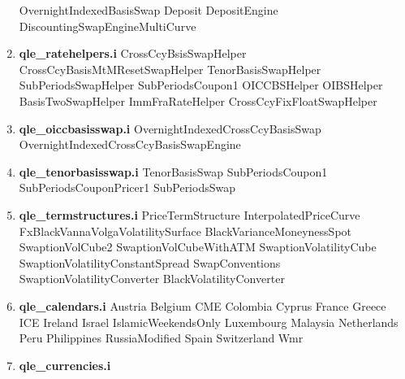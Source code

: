 \documentclass[10pt]{article}
\begin{document}
\begin{multicols}{2}
\begin{enumerate}
                \subitem OvernightIndexedBasisSwap
                \subitem Deposit
                \subitem DepositEngine
                \subitem DiscountingSwapEngineMultiCurve
        \item \textbf{qle\_ratehelpers.i}
                \subitem CrossCcyBsisSwapHelper
                \subitem CrossCcyBasisMtMResetSwapHelper
                \subitem TenorBasisSwapHelper
                \subitem SubPeriodsSwapHelper
                \subitem SubPeriodsCoupon1
                \subitem OICCBSHelper
                \subitem OIBSHelper
                \subitem BasisTwoSwapHelper
                \subitem ImmFraRateHelper
                \subitem CrossCcyFixFloatSwapHelper
        \item \textbf{qle\_oiccbasisswap.i}
                \subitem OvernightIndexedCrossCcyBasisSwap
                \subitem OvernightIndexedCrossCcyBasisSwapEngine
        \item \textbf{qle\_tenorbasisswap.i}
                \subitem TenorBasisSwap
                \subitem SubPeriodsCoupon1
                \subitem SubPeriodsCouponPricer1
                \subitem SubPeriodsSwap
        \item \textbf{qle\_termstructures.i}
                \subitem PriceTermStructure
                \subitem InterpolatedPriceCurve
                \subitem FxBlackVannaVolgaVolatilitySurface
                \subitem BlackVarianceMoneynessSpot
                \subitem SwaptionVolCube2
                \subitem SwaptionVolCubeWithATM
                \subitem SwaptionVolatilityCube
                \subitem SwaptionVolatilityConstantSpread
                \subitem SwapConventions
                \subitem SwaptionVolatilityConverter
                \subitem BlackVolatilityConverter    
        \item \textbf{qle\_calendars.i}
                \subitem Austria
                \subitem Belgium
                \subitem CME
                \subitem Colombia
                \subitem Cyprus
                \subitem France
                \subitem Greece
                \subitem ICE
                \subitem Ireland
                \subitem Israel
                \subitem IslamicWeekendsOnly
                \subitem Luxembourg
                \subitem Malaysia
                \subitem Netherlands
                \subitem Peru
                \subitem Philippines
                \subitem RussiaModified
                \subitem Spain
                \subitem Switzerland
                \subitem Wmr
        \item \textbf{qle\_currencies.i}

\end{enumerate}
\end{multicols}
\end{document}
